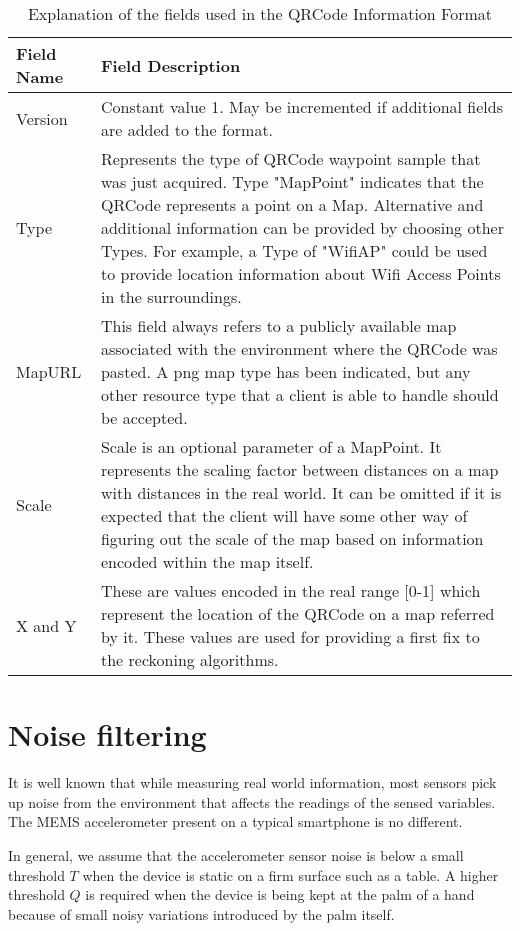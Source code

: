 \documentclass[10pt,journal,letterpaper,compsoc]{IEEEtran}
\begin{document}
\begin{table}
\centering
\begin{tabular}{p{1in} p{4in}}
\hline
\hline
Field Name      &       Field Description \\
\hline
Version         & Constant value 1. May be incremented if additional fields are added to the format. \\
Type            & Represents the type of QRCode waypoint sample that was just acquired. Type "MapPoint" indicates that the QRCode represents a point on a Map. Alternative and  additional information can be provided by choosing other Types. For example,  a Type of "WifiAP" could be used to provide location information about  Wifi Access Points in the surroundings. \\
MapURL          & This field always refers to a publicly available map associated with the environment where  the QRCode was pasted. A png map type has been indicated, but any other resource type that  a client is able to handle should be accepted. \\
Scale           & Scale is an optional parameter of a MapPoint. It represents the scaling factor between distances on a map with distances in the real world. It can be omitted if it is expected that the  client will have some other way of figuring out the scale of the map based on information encoded within the map itself. \\
X and Y         & These are values encoded in the real range [0-1] which represent the location of the QRCode on a map referred by it. These values are used for providing a first fix to the  reckoning algorithms.  \\
\hline
\end{tabular}
\caption{Explanation of the fields used in the QRCode Information Format\label{tbl:QRCode_fields_table}}
\end{table}

\section{Noise filtering\label{sec:NoiseClamping}}

It is well known that while measuring real world information, most sensors
 pick up noise from the environment that affects the readings of the 
sensed variables. The MEMS accelerometer present on a typical smartphone is 
no different. 

In general, we assume that the accelerometer sensor noise is below a small 
threshold $T$ when the device is static on a firm surface such as a table. 
A higher threshold $Q$ is required when the device is being kept at the palm of 
a hand because of small noisy variations introduced by the palm itself.
\end{document}
